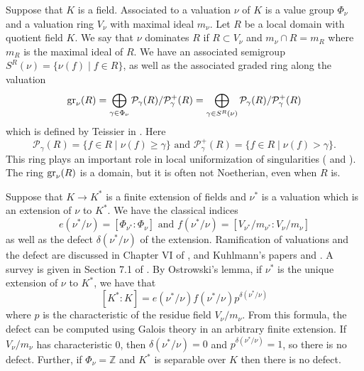 \documentclass[11pt]{amsart}
\def\NZQ{\mathbb}               %
\def\ZZ{{\NZQ Z}}
\begin{document}
Suppose that $K$ is a field. Associated to a valuation $\nu$ of $K$  is a value group $\Phi_{\nu}$ and  a valuation ring $V_{\nu}$ with maximal ideal $m_{\nu}$. Let $R$ be a local domain with quotient field $K$. We say that $\nu$ dominates $R$ if $R\subset V_{\nu}$ and $m_{\nu}\cap R=m_R$ where $m_R$ is the maximal ideal of $R$. We have an associated semigroup $S^R(\nu)=\{\nu(f)\mid f\in R\}$, as well as the associated graded ring along the valuation
\begin{equation}\label{eqN31}
{\rm gr}_{\nu}(R)=\bigoplus_{\gamma\in \Phi_{\nu}}\mathcal P_{\gamma}(R)/\mathcal P^+_{\gamma}(R)=\bigoplus_{\gamma\in S^{R}(\nu)}\mathcal P_{\gamma}(R)/\mathcal P^+_{\gamma}(R)
\end{equation}
which is defined by Teissier in \cite{T1}. Here 
$$
\mathcal P_{\gamma}(R)=\{f\in R\mid \nu(f)\ge \gamma\}\mbox{ and }\mathcal P^+_{\gamma}(R)=\{f\in R\mid \nu(f)> \gamma\}.
$$ 
This ring plays an important role in local uniformization of singularities (\cite{T1} and \cite{T2}).
The ring ${\rm gr}_{\nu}(R)$ is a domain, but it is often not Noetherian, even when $R$ is.

Suppose that $K\rightarrow K^*$ is a finite extension of  fields and $\nu^*$ is a valuation which is an extension of $\nu$ to $K^*$. We have the classical indices
$$
e(\nu^*/\nu)=[\Phi_{\nu^*}:\Phi_{\nu}]\mbox{ and }f(\nu^*/\nu)=[V_{\nu^*}/m_{\nu^*}:V_{\nu}/m_{\nu}]
$$
as well as the defect  $\delta(\nu^*/\nu)$ of the extension. Ramification of valuations and the defect are discussed in Chapter VI of \cite{ZS2}, \cite{E} and Kuhlmann's papers \cite{Ku1} and \cite{Ku3}. A survey is given in Section 7.1 of \cite{CP}. By Ostrowski's lemma, if $\nu^*$ is the unique extension of $\nu$ to $K^*$, we have that
\begin{equation}\label{int3}
[K^*:K]=e(\nu^*/\nu)f(\nu^*/\nu)p^{\delta(\nu^*/\nu)}
\end{equation}
where $p$ is the characteristic of the residue field $V_{\nu}/m_{\nu}$. From this formula, the defect can be computed using Galois theory in an arbitrary finite extension. 
If  $V_{\nu}/m_{\nu}$ has characteristic 0, then $\delta(\nu^*/\nu)=0$ and  $p^{\delta(\nu^*/\nu)}=1$, so there is no defect. Further, if $\Phi_{\nu}=\ZZ$ and $K^*$ is separable over $K$ then there is no defect. 
\end{document}
